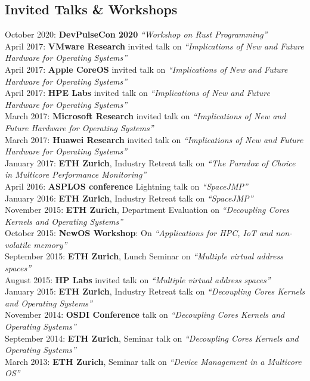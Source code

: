 \documentclass[margin,line]{resume}
\begin{document}
\begin{resume}
    \section{\mysidestyle Invited Talks \& Workshops}

    October 2020: \textbf{DevPulseCon 2020} \textit{``Workshop on Rust Programming''}\\
    April 2017: \textbf{VMware Research} invited talk on \textit{``Implications of New and Future Hardware for Operating Systems''}\\
    April 2017: \textbf{Apple CoreOS} invited talk on \textit{``Implications of New and Future Hardware for Operating Systems''}\\
    April 2017: \textbf{HPE Labs} invited talk on \textit{``Implications of New and Future Hardware for Operating Systems''}\\
    March 2017: \textbf{Microsoft Research} invited talk on \textit{``Implications of New and Future Hardware for Operating Systems''}\\
    March 2017: \textbf{Huawei Research} invited talk on \textit{``Implications of New and Future Hardware for Operating Systems''}\\
    January 2017: \textbf{ETH Zurich}, Industry Retreat talk on \textit{``The Paradox of Choice in Multicore Performance Monitoring''}\\
    April 2016: \textbf{ASPLOS conference} Lightning talk on \textit{``SpaceJMP''}\\
    January 2016: \textbf{ETH Zurich}, Industry Retreat talk on \textit{``SpaceJMP''}\\
    November 2015: \textbf{ETH Zurich}, Department Evaluation on \textit{``Decoupling Cores Kernels and Operating Systems''}\\
    October 2015: \textbf{NewOS Workshop}: On \textit{``Applications for HPC, IoT and non-volatile memory''}\\
    September 2015: \textbf{ETH Zurich}, Lunch Seminar on \textit{``Multiple virtual address spaces''}\\
    August 2015: \textbf{HP Labs} invited talk on \textit{``Multiple virtual address spaces''}\\
    January 2015: \textbf{ETH Zurich}, Industry Retreat talk on \textit{``Decoupling Cores Kernels and Operating Systems''}\\
    November 2014: \textbf{OSDI Conference} talk on \textit{``Decoupling Cores Kernels and Operating Systems''}\\
    September 2014: \textbf{ETH Zurich}, Seminar talk on \textit{``Decoupling Cores Kernels and Operating Systems''}\\
    March 2013: \textbf{ETH Zurich}, Seminar talk on \textit{``Device Management in a Multicore OS''}\\


\end{resume}
\end{document}

